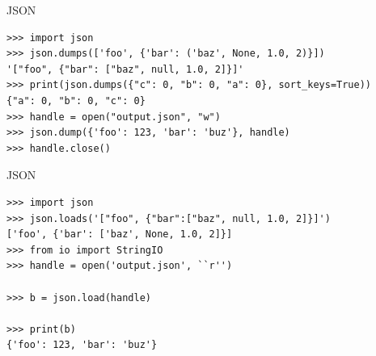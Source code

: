 \documentclass{beamer}
\begin{document}
\begin{frame}[t,fragile]{JSON}

\scriptsize
\begin{verbatim}
>>> import json
>>> json.dumps(['foo', {'bar': ('baz', None, 1.0, 2)}])
'["foo", {"bar": ["baz", null, 1.0, 2]}]'
>>> print(json.dumps({"c": 0, "b": 0, "a": 0}, sort_keys=True))
{"a": 0, "b": 0, "c": 0}
>>> handle = open("output.json", "w")
>>> json.dump({'foo': 123, 'bar': 'buz'}, handle)
>>> handle.close()
\end{verbatim}
\end{frame}

\begin{frame}[t,fragile]{JSON}
	\scriptsize
\begin{verbatim}
>>> import json
>>> json.loads('["foo", {"bar":["baz", null, 1.0, 2]}]')
['foo', {'bar': ['baz', None, 1.0, 2]}]
>>> from io import StringIO
>>> handle = open('output.json', ``r'')

>>> b = json.load(handle)

>>> print(b)
{'foo': 123, 'bar': 'buz'}
\end{verbatim}
\end{frame}
\end{document}
